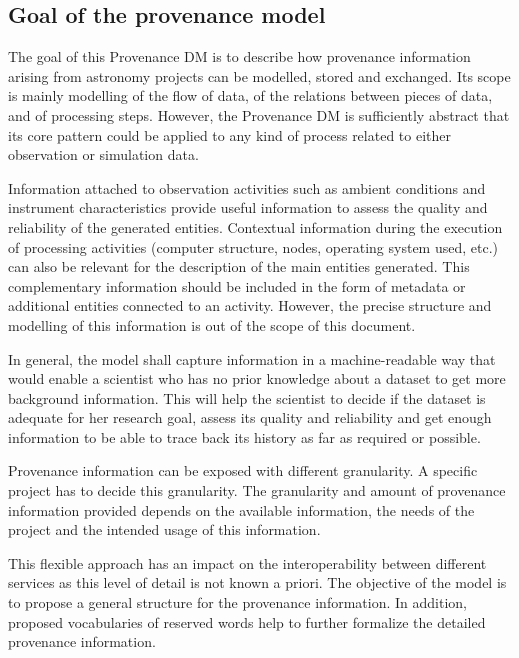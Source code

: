 \subsection{Goal of the provenance model}
\label{sec:goals}

The goal of this Provenance DM is to describe how provenance information arising from astronomy projects can be modelled, stored and exchanged. 
Its scope is mainly modelling of the flow of data, of the relations between pieces of data, and of processing steps. 
However, the Provenance DM is sufficiently abstract that its core pattern could be applied to any kind of process related to either observation or simulation data.

Information attached to observation activities such as ambient conditions and instrument characteristics provide useful information to assess the quality and reliability of the generated entities.
Contextual information during the execution of processing activities (computer structure, nodes, operating system used, etc.) can also be relevant for the description of the main entities generated. 
This complementary information should be included in the form of metadata or additional entities connected to an activity. 
However, the precise structure and modelling of this information is out of the scope of this document. 

In general, the model shall capture information in a machine-readable way that would enable a scientist who has no prior knowledge about a dataset to get more background information. 
This will help the scientist to decide if the dataset is adequate for her research goal, assess its quality and reliability and get enough information to be able to trace back its history as far as required or possible. 

Provenance information can be exposed with different granularity. A specific project has to decide this granularity.
The granularity and amount of provenance information provided depends on the available information, the needs of the project and the intended usage of this information.

This flexible approach has an impact on the interoperability between different services as this level of detail is not known a priori. 
The objective of the model is to propose a general structure for the provenance information. In addition, proposed vocabularies of reserved words help to further formalize the detailed provenance information.


